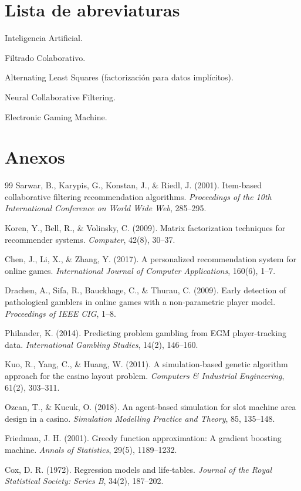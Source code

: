 \documentclass[12pt,a4paper]{article}
\begin{document}
\section*{Lista de abreviaturas}
\begin{description}[leftmargin=*]
    \item[IA] Inteligencia Artificial.
    \item[CF] Filtrado Colaborativo.
    \item[ALS] Alternating Least Squares (factorización para datos implícitos).
    \item[NCF] Neural Collaborative Filtering.
    \item[EGM] Electronic Gaming Machine.
\end{description}

\section*{Anexos}


\newpage
\begin{thebibliography}{99}
 Sarwar, B., Karypis, G., Konstan, J., \& Riedl, J. (2001). Item-based collaborative filtering recommendation algorithms. \emph{Proceedings of the 10th International Conference on World Wide Web}, 285--295.

 Koren, Y., Bell, R., \& Volinsky, C. (2009). Matrix factorization techniques for recommender systems. \emph{Computer}, 42(8), 30--37.

 Chen, J., Li, X., \& Zhang, Y. (2017). A personalized recommendation system for online games. \emph{International Journal of Computer Applications}, 160(6), 1--7.

 Drachen, A., Sifa, R., Bauckhage, C., \& Thurau, C. (2009). Early detection of pathological gamblers in online games with a non-parametric player model. \emph{Proceedings of IEEE CIG}, 1--8.

 Philander, K. (2014). Predicting problem gambling from EGM player-tracking data. \emph{International Gambling Studies}, 14(2), 146--160.

 Kuo, R., Yang, C., \& Huang, W. (2011). A simulation-based genetic algorithm approach for the casino layout problem. \emph{Computers \& Industrial Engineering}, 61(2), 303--311.

 Ozcan, T., \& Kucuk, O. (2018). An agent-based simulation for slot machine area design in a casino. \emph{Simulation Modelling Practice and Theory}, 85, 135--148.

 Friedman, J. H. (2001). Greedy function approximation: A gradient boosting machine. \emph{Annals of Statistics}, 29(5), 1189--1232.

 Cox, D. R. (1972). Regression models and life‐tables. \emph{Journal of the Royal Statistical Society: Series B}, 34(2), 187--202.
\end{thebibliography}
\end{document}

